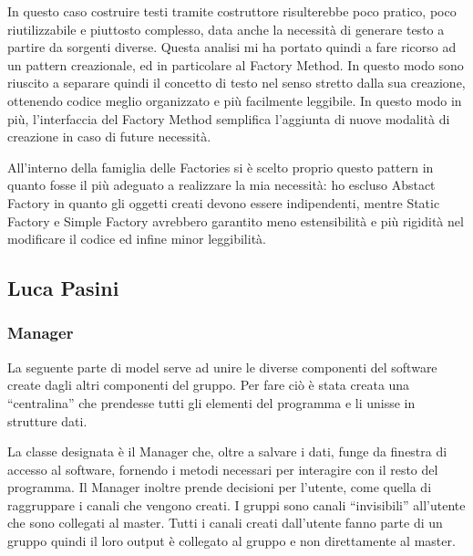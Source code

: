 \documentclass[a4paper,12pt]{report}
\begin{document}
In questo caso costruire testi tramite costruttore risulterebbe poco pratico, poco riutilizzabile e piuttosto complesso, data anche la necessità di generare testo a partire da sorgenti diverse. Questa analisi mi ha portato quindi a fare ricorso ad un pattern creazionale, ed in particolare al Factory Method. In questo modo sono riuscito a separare quindi il concetto di testo nel senso stretto dalla sua creazione, ottenendo codice meglio organizzato e più facilmente leggibile. In questo modo in più, l’interfaccia del Factory Method semplifica l’aggiunta di nuove modalità di creazione in caso di future necessità. 

All’interno della famiglia delle Factories si è scelto proprio questo pattern in quanto fosse il più adeguato a realizzare la mia necessità: ho escluso Abstact Factory in quanto gli oggetti creati devono essere indipendenti, mentre Static Factory e Simple Factory avrebbero garantito meno estensibilità e più rigidità nel modificare il codice ed infine minor leggibilità.
\endsubsubsection
\endsubsection

\subsection{Luca Pasini}
\subsubsection{Manager}
La seguente parte di model serve ad unire le diverse componenti del software create dagli altri componenti del gruppo. Per fare ciò è stata creata una “centralina” che prendesse tutti gli elementi del programma e li unisse in strutture dati. 

La classe designata è il Manager che, oltre a salvare i dati, funge da finestra di accesso al software, fornendo i metodi necessari per interagire con il resto del programma. Il Manager inoltre prende decisioni per l’utente, come quella di raggruppare i canali che vengono creati. I gruppi sono canali “invisibili” all’utente che sono collegati al master. Tutti i canali creati dall’utente fanno parte di un gruppo quindi il loro output è collegato al gruppo e non direttamente al master.
\end{document}
